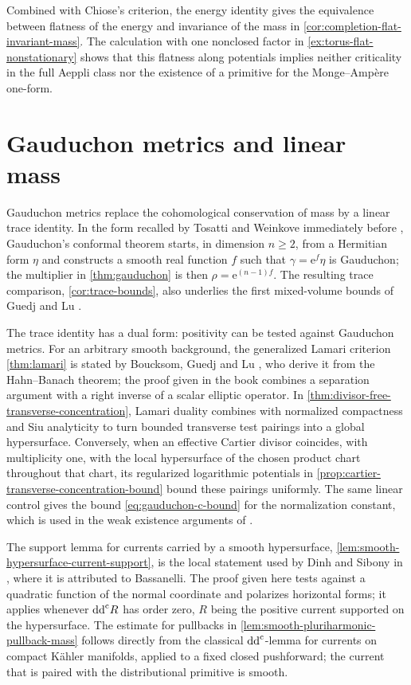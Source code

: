 Combined with Chiose's criterion, the energy identity gives the equivalence between flatness of the energy and invariance of the mass in \cref{cor:completion-flat-invariant-mass}. The calculation with one nonclosed factor in \cref{ex:torus-flat-nonstationary} shows that this flatness along potentials implies neither criticality in the full Aeppli class nor the existence of a primitive for the Monge--Amp\`ere one-form.

\section{Gauduchon metrics and linear mass}
\label{sec:history-gauduchon}

Gauduchon metrics replace the cohomological conservation of mass by a linear trace identity. In the form recalled by Tosatti and Weinkove immediately before \cite[Lemma~2.3]{TW10}, Gauduchon's conformal theorem starts, in dimension $n\geq2$, from a Hermitian form $\eta$ and constructs a smooth real function $f$ such that $\gamma=\mathrm e^f\eta$ is Gauduchon; the multiplier in \cref{thm:gauduchon} is then $\rho=\mathrm e^{(n-1)f}$. The resulting trace comparison, \cref{cor:trace-bounds}, also underlies the first mixed-volume bounds of Guedj and Lu \cite[Proposition~3.3]{GL22}.

The trace identity has a dual form: positivity can be tested against Gauduchon metrics. For an arbitrary smooth background, the generalized Lamari criterion \cref{thm:lamari} is stated by Boucksom, Guedj and Lu \cite[Lemma~1.15]{BGL25}, who derive it from the Hahn--Banach theorem; the proof given in the book combines a separation argument with a right inverse of a scalar elliptic operator. In \cref{thm:divisor-free-transverse-concentration}, Lamari duality combines with normalized compactness and Siu analyticity to turn bounded transverse test pairings into a global hypersurface. Conversely, when an effective Cartier divisor coincides, with multiplicity one, with the local hypersurface of the chosen product chart throughout that chart, its regularized logarithmic potentials in \cref{prop:cartier-transverse-concentration-bound} bound these pairings uniformly. The same linear control gives the bound \eqref{eq:gauduchon-c-bound} for the normalization constant, which is used in the weak existence arguments of \cite[Section~4]{BGL25}.

The support lemma for currents carried by a smooth hypersurface, \cref{lem:smooth-hypersurface-current-support}, is the local statement used by Dinh and Sibony in \cite[proof of Theorem~4.1, pp.~965--966]{DinhSibonyRegularization04}, where it is attributed to Bassanelli. The proof given here tests against a quadratic function of the normal coordinate and polarizes horizontal forms; it applies whenever $\mathrm{dd}^{\mathrm{c}} R$ has order zero, $R$ being the positive current supported on the hypersurface. The estimate for pullbacks in \cref{lem:smooth-pluriharmonic-pullback-mass} follows directly from the classical $\mathrm{dd}^{\mathrm{c}}$-lemma for currents on compact K\"ahler manifolds, applied to a fixed closed pushforward; the current that is paired with the distributional primitive is smooth.

